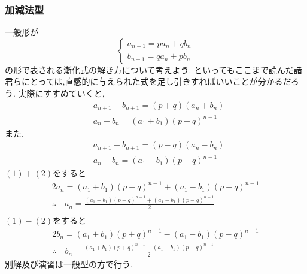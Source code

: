 
\subsubsection{加減法型}
一般形が
\[
  \begin{cases}
    a_{n+1}=pa_{n}+qb_{n} \\
    b_{n+1}=qa_{n}+pb_{n}
  \end{cases}
\]
の形で表される漸化式の解き方について考えよう.
といってもここまで読んだ諸君らにとっては,直感的に与えられた式を足し引きすればいいことが分かるだろう.
実際にすすめていくと,
\begin{align*}
   & a_{n+1}+b_{n+1}=(p+q)(a_{n}+b_{n})  \\
   & a_n+b_n=(a_1+b_1)(p+q)^{n-1}\tag{1}
\end{align*}
また,
\begin{align*}
   & a_{n+1}-b_{n+1}=(p-q)(a_{n}-b_{n})  \\
   & a_n-b_n=(a_1-b_1)(p-q)^{n-1}\tag{2}
\end{align*}
$(1)+(2)$をすると
\begin{align*}
  2a_n=(a_1+b_1)(p+q)^{n-1}+(a_1-b_1)(p-q)^{n-1}                           \\
  \therefore \quad a_n=\frac{(a_1+b_1)(p+q)^{n-1}+(a_1-b_1)(p-q)^{n-1}}{2} \\
\end{align*}
$(1)-(2)$をすると
\begin{align*}
  2b_n=(a_1+b_1)(p+q)^{n-1}-(a_1-b_1)(p-q)^{n-1} \\
  \therefore \quad b_n=\frac{(a_1+b_1)(p+q)^{n-1}-(a_1-b_1)(p-q)^{n-1}}{2}
\end{align*}
別解及び演習は一般型の方で行う.
